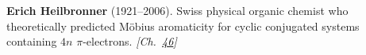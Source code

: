\textbf{Erich Heilbronner} (1921–2006). Swiss physical organic chemist who theoretically predicted M\"{o}bius aromaticity for cyclic conjugated systems containing $4n$ $\pi$-electrons. \emph{[Ch.~\hyperref[ch:woodwardhoffmannrules]{46}]}

